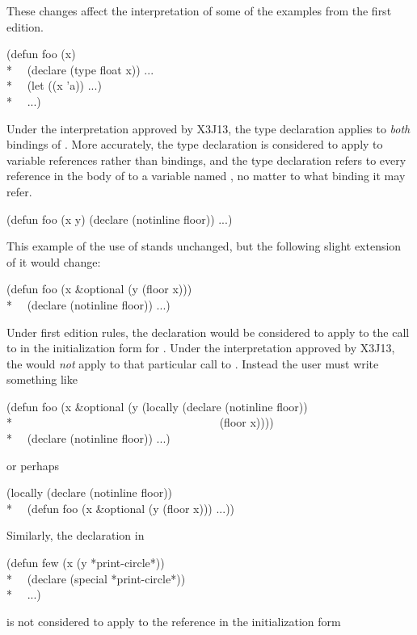 \begin{defspec}
\begin{new}
These changes affect the interpretation of some of the examples from the
first edition.
\begin{lisp}
(defun foo (x) \\*
~~(declare (type float x)) ... \\*
~~(let ((x 'a)) ...) \\*
~~...)
\end{lisp}
Under the interpretation approved by X3J13, the type
declaration applies to \emph{both} bindings of .
More accurately, the type declaration is considered to apply to
variable references rather than bindings, and the type declaration refers
to every reference in the body of  to a variable named ,
no matter to what binding it may refer.
\begin{lisp}
(defun foo (x y) (declare (notinline floor)) ...)
\end{lisp}
This example of the use of  stands unchanged, but the following
slight extension of it would change:
\begin{lisp}
(defun foo (x \&optional (y (floor x))) \\*
~~(declare (notinline floor)) ...)
\end{lisp}
Under first edition rules, the  declaration would be
considered to apply to the call to  in the initialization
form for .  Under the interpretation approved by X3J13, the
 would \emph{not} apply to that particular call to .
Instead the user must write something like
\begin{lisp}
(defun foo (x \&optional (y (locally (declare (notinline floor)) \\*
~~~~~~~~~~~~~~~~~~~~~~~~~~~~~~~~~~~~(floor x)))) \\*
~~(declare (notinline floor)) ...)
\end{lisp}
or perhaps
\begin{lisp}
(locally (declare (notinline floor)) \\*
~~(defun foo (x \&optional (y (floor x))) ...))
\end{lisp}
Similarly, the  declaration in
\begin{lisp}
(defun few (x  (y *print-circle*)) \\*
~~(declare (special *print-circle*)) \\*
~~...)
\end{lisp}
is not considered to apply to the reference in the initialization form

\end{new}
\end{defspec}
